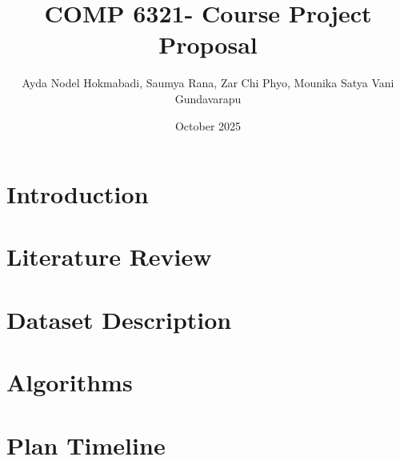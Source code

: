 \documentclass{article}
\title{COMP 6321- Course Project Proposal}
\author{Ayda Nodel Hokmabadi, Saumya Rana, Zar Chi Phyo, Mounika Satya Vani Gundavarapu}
\date{October 2025}
\begin{document}
\maketitle

\section{Introduction}

\section{Literature Review}

\section{Dataset Description}

\section{Algorithms}

\section{Plan Timeline}
\end{document}
